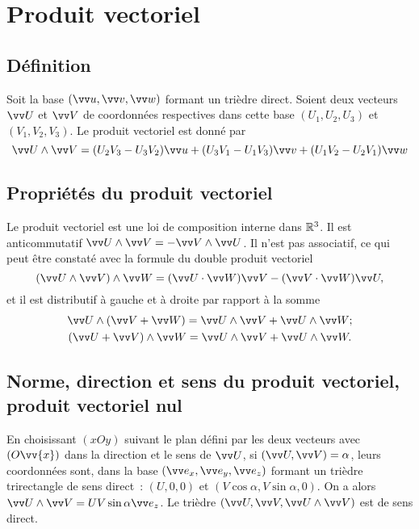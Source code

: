\section{Produit vectoriel}%
\label{chap1-sec:produitvectoriel}%

\subsection{Définition}%
\label{chap1-subsec:defprodvec}%

Soit la base \((\vu,\vvv,\vw)\) formant un trièdre direct. Soient deux vecteurs 
\(\vU\) et \(\vV\) de coordonnées respectives dans cette base \((U_1,U_2,U_3)\) 
et \((V_1,V_2,V_3)\). Le produit vectoriel est donné par
\begin{equation}%
  \vU \wedge \vV = (U_2V_3-U_3V_2) \vu + (U_3V_1-U_1V_3) \vvv + (U_1V_2-U_2V_1) 
  \vw
\end{equation}%

\subsection{Propriétés du produit vectoriel}%
\label{chap1-subsec:propprodvec}%

Le produit vectoriel est une loi de composition interne dans \(\mathbb{R}^3\). Il est 
anticommutatif \(\vU\wedge\vV=-\vV\wedge\vU\). Il n'est pas associatif, ce qui 
peut être constaté avec la formule du double produit vectoriel
\begin{equation}%
  \label{eq:doubleproduitvectoriel}%
  (\vU\wedge\vV)\wedge\vW=(\vU\cdot\vW)\vV-(\vV\cdot\vW)\vU,
\end{equation}%
et il est distributif à gauche et à droite par rapport à la somme
\begin{gather}%
  \vU\wedge(\vV+\vW)= \vU\wedge\vV + \vU\wedge\vW;\\
  (\vU+\vV)\wedge\vW = \vU\wedge\vV + \vU\wedge\vW.
\end{gather}%

\subsection{Norme, direction et sens du produit vectoriel, produit vectoriel 
nul}
\label{chap1-sec:normedirectionetsensproduitvectoriel}%

En choisissant \((xOy)\) suivant le plan défini par les deux vecteurs avec 
\((O\vv{x})\) dans la direction et le sens de \(\vU\), si \((\vU,\vV)=\alpha\), 
leurs coordonnées sont, dans la base \((\ex,\ey,\ez)\) formant un trièdre 
trirectangle de sens direct~: \((U,0,0)\) et \((V\cos\alpha,V\sin\alpha,0)\). 
On a alors \(\vU\wedge\vV = UV\sin\alpha\ez\). Le trièdre 
\((\vU,\vV,\vU\wedge\vV)\) est de sens direct.

